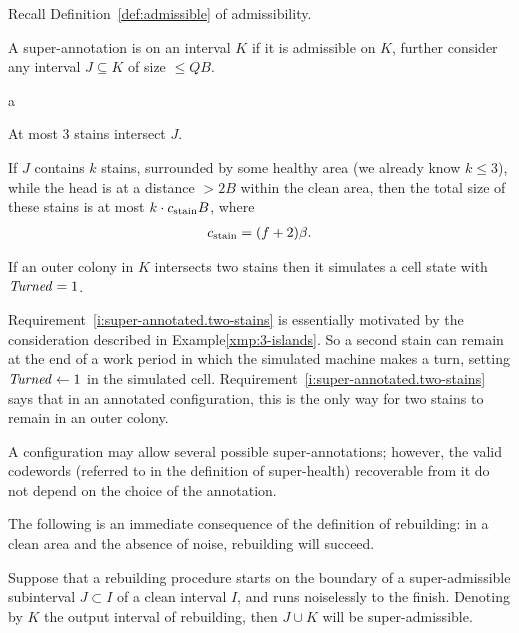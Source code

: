 \documentclass[11pt]{memoir}
\theoremstyle{definition} %
\renewcommand{\le}{\leq}
\newcommand{\fld}[1]{\ensuremath{\textit{#1\/}}}
\def\B{B}
\renewcommand{\f}{f} %
\newcommand{\Q}{Q}
\newcommand{\Turned}{\fld{Turned}}
\newcommand{\cns}[1]{c_{\textrm{\upshape #1}}}
\begin{document}
Recall Definition~\ref{def:admissible} of admissibility.
  \begin{definition}\label{def:super-admissible}
A super-annotation is  on an interval \( K \) if it is admissible on \( K \),
further consider any interval \( J\subseteq K\) of size \( \le\Q\B \).
\begin{varenum}[resume=admissible]{a}
\item At most 3 stains intersect \( J \).
\item If \( J \) contains \( k \) stains, surrounded by some healthy area
(we already know \( k\le 3 \)), while the head is at a distance \( >2\B \) within the clean area,
then the total size of these stains is at most \( k\cdot\cns{stain}\B \), where
\begin{align}\label{eq:stain}
   \cns{stain} = (\f+2)\beta.
 \end{align}
\item\label{i:super-annotated.two-stains} If an outer colony in \( K \)
  intersects two stains then it simulates a cell state with \( \Turned=1 \).
\end{varenum}
\end{definition}

Requirement~\eqref{i:super-annotated.two-stains} is essentially motivated by
the consideration described in Example\ref{xmp:3-islands}.
So a second stain can remain at the end of a work period in which the simulated
machine makes a turn, setting \( \Turned\gets 1 \) in the simulated cell.
Requirement~\eqref{i:super-annotated.two-stains} says that in an annotated
configuration, this is the only way for two stains to remain in an outer colony.

A configuration may allow several possible super-annotations;
however, the valid codewords (referred to in the definition
of super-health) recoverable from it do not depend on the choice of the
annotation.

The following is an immediate consequence of the definition of rebuilding:
in a clean area and the absence of noise, rebuilding will succeed.

\begin{lemma}\label{lem:rebuild-health}
  Suppose that a rebuilding procedure starts on the boundary of a super-admissible subinterval
  \( J\subset I \) of a clean interval \( I \), and runs noiselessly to the finish.
  Denoting by \( K \) the output interval of rebuilding, then \( J\cup K \) will be super-admissible.
\end{lemma}
\end{document}
